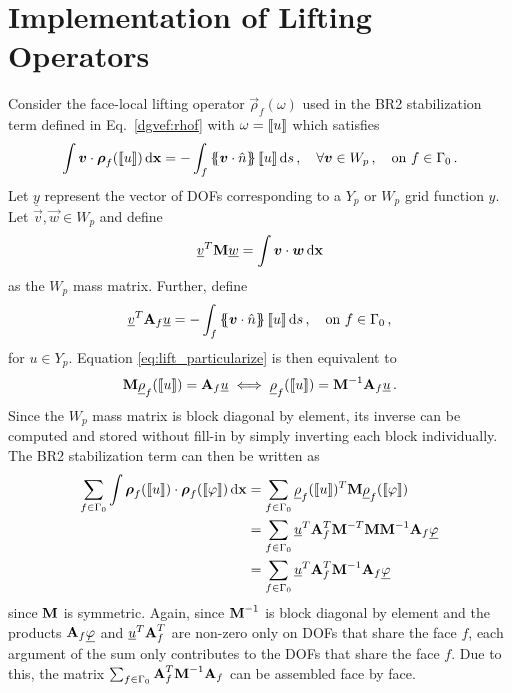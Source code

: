 \documentclass[../doc.tex]{subfiles}
\begin{document}
\section{Implementation of Lifting Operators}
Consider the face-local lifting operator $\vec{\rho}_f(\omega)$ used in the BR2 stabilization term defined in Eq.~\ref{dgvef:rhof} with $\omega = \left\llbracket u \right\rrbracket$ which satisfies
	\begin{equation} \label{eq:lift_particularize}
		\int \boldsymbol{v}\cdot\boldsymbol{\rho}_f(\left\llbracket u \right\rrbracket) \mathop{}\!\mathrm{d} \boldsymbol{\mathrm{x}} = -\int_{f} \left\{\!\!\left\{\boldsymbol{v}\cdot\hat{n}\right\}\!\!\right\} \left\llbracket u \right\rrbracket \mathop{}\!\mathrm{d} s \,, \quad \forall \boldsymbol{v} \in W_p\,, \quad \text{on} \ f \in \Gamma_0 \,. 
	\end{equation}
Let $\underline{y}$ represent the vector of DOFs corresponding to a $Y_p$ or $W_p$ grid function $y$. Let $\vec{v},\vec{w} \in W_p$ and define 
	\begin{equation}
		\underline{v}^T \boldsymbol{\mathrm{M}} \underline{w} = \int \boldsymbol{v}\cdot\boldsymbol{w} \mathop{}\!\mathrm{d} \boldsymbol{\mathrm{x}} 
	\end{equation}
as the $W_p$ mass matrix. Further, define 
	\begin{equation}
		\underline{v}^T \boldsymbol{\mathrm{A}}_f \underline{u} = - \int_f \left\{\!\!\left\{\boldsymbol{v}\cdot\hat{n}\right\}\!\!\right\} \left\llbracket u \right\rrbracket \mathop{}\!\mathrm{d} s \,, \quad \text{on} \ f \in \Gamma_0 \,, 
	\end{equation}
for $u \in Y_p$. 
Equation \ref{eq:lift_particularize} is then equivalent to 
	\begin{equation}
		\boldsymbol{\mathrm{M}} \underline{\rho}_f(\left\llbracket u \right\rrbracket) = \boldsymbol{\mathrm{A}}_f \underline{u} \iff \underline{\rho}_f(\left\llbracket u \right\rrbracket) = \boldsymbol{\mathrm{M}}^{-1} \boldsymbol{\mathrm{A}}_f \underline{u} \,. 
	\end{equation}
Since the $W_p$ mass matrix is block diagonal by element, its inverse can be computed and stored without fill-in by simply inverting each block individually. The BR2 stabilization term can then be written as 
	\begin{equation}
	\begin{aligned}
		\sum_{f\in\Gamma_0}\int \boldsymbol{\rho}_f(\left\llbracket u \right\rrbracket) \cdot\boldsymbol{\rho}_f(\left\llbracket\varphi \right\rrbracket) \mathop{}\!\mathrm{d} \boldsymbol{\mathrm{x}} &= \sum_{f\in\Gamma_0}\underline{\rho}_f(\left\llbracket u \right\rrbracket)^T \boldsymbol{\mathrm{M}} \underline{\rho}_f(\left\llbracket\varphi \right\rrbracket) \\
		&= \sum_{f\in\Gamma_0}\underline{u}^T \boldsymbol{\mathrm{A}}_f^T \boldsymbol{\mathrm{M}}^{-T} \boldsymbol{\mathrm{M}} \boldsymbol{\mathrm{M}}^{-1} \boldsymbol{\mathrm{A}}_f \underline{\varphi} \\
		&= \sum_{f\in\Gamma_0}\underline{u}^T \boldsymbol{\mathrm{A}}_f^T \boldsymbol{\mathrm{M}}^{-1} \boldsymbol{\mathrm{A}}_f \underline{\varphi} 
	\end{aligned}
	\end{equation}
since $\boldsymbol{\mathrm{M}}$ is symmetric. Again, since $\boldsymbol{\mathrm{M}}^{-1}$ is block diagonal by element and the products $\boldsymbol{\mathrm{A}}_f\underline{\varphi}$ and $\underline{u}^T \boldsymbol{\mathrm{A}}_f^T$ are non-zero only on DOFs that share the face $f$, each argument of the sum only contributes to the DOFs that share the face $f$. Due to this, the matrix $\sum_{f\in\Gamma_0} \boldsymbol{\mathrm{A}}_f^T \boldsymbol{\mathrm{M}}^{-1} \boldsymbol{\mathrm{A}}_f$ can be assembled face by face. 
\end{document}
